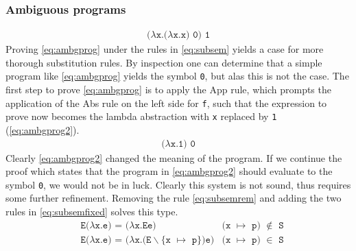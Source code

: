 \subsubsection{Ambiguous programs}
\begin{align}
	\texttt{($\lambda$x.($\lambda$x.x) 0) 1} \label{eq:ambgprog}
\end{align}
Proving \autoref{eq:ambgprog} under the rules in \autoref{eq:subsem} yields a case for more thorough substitution rules.
By inspection one can determine that a simple program like \autoref{eq:ambgprog} yields the symbol \texttt{0}, but alas this is not the case.
The first step to prove \autoref{eq:ambgprog} is to apply the App rule, which prompts the application of the Abs rule on the left side for \texttt{f}, such that the expression to prove now becomes the lambda abstraction with \texttt{x} replaced by \texttt{1} (\autoref{eq:ambgprog2}).
\begin{align}
	\texttt{($\lambda$x.1) 0} \label{eq:ambgprog2}
\end{align}
Clearly \autoref{eq:ambgprog2} changed the meaning of the program.
If we continue the proof which states that the program in \autoref{eq:ambgprog2} should evaluate to the symbol \texttt{0}, we would not be in luck.
Clearly this system is not sound, thus requires some further refinement.
Removing the rule \autoref{eq:subsemrem} and adding the two rules in \autoref{eq:subsemfixed} solves this type.
\begin{align}
	 & \texttt{E($\lambda$x.e) = ($\lambda$x.Ee)}                                & \texttt{(x $\mapsto$ p) $\notin$ S} \label{eq:subsemfixed} \\
	 & \texttt{E($\lambda$x.e) = ($\lambda$x.(E$\backslash$\{x $\mapsto$ p\})e)} & \texttt{(x $\mapsto$ p) $\in$ S} \tag*{}
\end{align}
